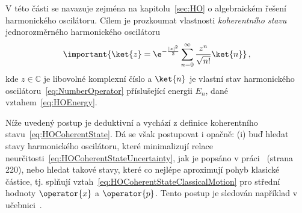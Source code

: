 V této části se navazuje zejména na kapitolu~\ref{sec:HO} o algebraickém řešení harmonického oscilátoru.
Cílem je prozkoumat vlastnosti \emph{koherentního stavu} jednorozměrného harmonického oscilátoru
\begin{equation}
	\label{eq:HOCoherentState}
	\important{\ket{z}=\e^{-\frac{|z|^{2}}{2}}\sum_{n=0}^{\infty}\frac{z^{n}}{\sqrt{n!}}\ket{n}}\,,
\end{equation}
kde $z\in\mathbb{C}$ je libovolné komplexní číslo a $\ket{n}$ je vlastní stav harmonického oscilátoru~\eqref{eq:NumberOperator} příslušející energii $E_{n}$, dané vztahem~\eqref{eq:HOEnergy}.

Níže uvedený postup je deduktivní a vychází z definice koherentního stavu~\eqref{eq:HOCoherentState}.
Dá se však postupovat i opačně: (i) buď hledat stavy harmonického oscilátoru, které minimalizují relace neurčitosti~\eqref{eq:HOCoherentStateUncertainty}, jak je popsáno v práci~\cite{Formanek2004} (strana 220), nebo hledat takové stavy, které co nejlépe aproximují pohyb klasické částice, tj. splňují vztah~\eqref{eq:HOCoherentStateClassicalMotion} pro střední hodnoty $\operator{x}$ a $\operator{p}$.
Tento postup je sledován například v učebnici~\cite{Manoukian2006}.